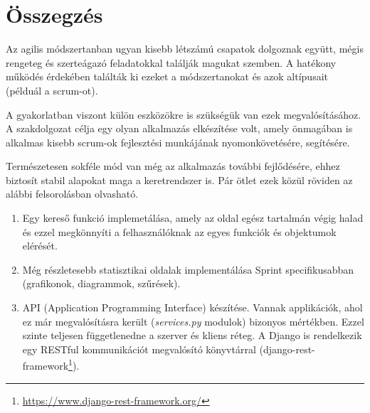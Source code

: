 \chapter{Összegzés} %
\label{ch:sum}

Az agilis módszertanban ugyan kisebb létszámú csapatok dolgoznak együtt, mégis rengeteg és szerteágazó feladatokkal találják magukat szemben. A hatékony működés érdekében találták ki ezeket a módszertanokat és azok altípusait (példuál a scrum-ot). 

A gyakorlatban viszont külön eszközökre is szükségük van ezek megvalósításához. A szakdolgozat célja egy olyan alkalmazás elkészítése volt, amely önmagában is alkalmas kisebb scrum-ok fejlesztési munkájának nyomonkövetésére, segítésére. 

Természetesen sokféle mód van még az alkalmazás további fejlődésére, ehhez biztosít stabil alapokat maga a keretrendszer is. Pár ötlet ezek közül röviden az alábbi felsorolásban olvasható.

\begin{enumerate}
    \item Egy kereső funkció implemetálása, amely az oldal egész tartalmán végig halad és ezzel megkönnyíti a felhasználóknak az egyes funkciók és objektumok elérését.
    \item Még részletesebb statisztikai oldalak implementálása Sprint specifikusabban (grafikonok, diagrammok, szűrések).
    \item API (Application Programming Interface) készítése. Vannak applikációk, ahol ez már megvalósításra került (\textit{services.py} modulok) bizonyos mértékben. Ezzel szinte teljesen függetlenedne a szerver és kliens réteg.
    A Django is rendelkezik egy RESTful kommunikációt megvalósító könyvtárral (django-rest-framework\footnote{\url{https://www.django-rest-framework.org/}}).
\end{enumerate}




